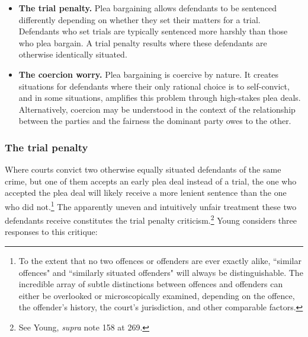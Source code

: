 \begin{itemize}
    \item \textbf{The trial penalty.} Plea bargaining allows defendants to be sentenced differently depending on whether they set their matters for a trial. Defendants who set trials are typically sentenced more harshly than those who plea bargain. A trial penalty results where these defendants are otherwise identically situated.
    \item \textbf{The coercion worry.} Plea bargaining is coercive by nature. It creates situations for defendants where their only rational choice is to self-convict, and in some situations, amplifies this problem through high-stakes plea deals. Alternatively, coercion may be understood in the context of the relationship between the parties and the fairness the dominant party owes to the other.
\end{itemize}

\subsubsection{The trial penalty}

Where courts convict two otherwise equally situated defendants of the same crime, but one of them accepts an early plea deal instead of a trial, the one who accepted the plea deal will likely receive a more lenient sentence than the one who did not.\footnote{To the extent that no two offences or offenders are ever exactly alike, ``similar offences" and ``similarly situated offenders" will always be distinguishable. The incredible array of subtle distinctions between offences and offenders can either be overlooked or microscopically examined, depending on the offence, the offender's history, the court's jurisdiction, and other comparable factors.} The apparently uneven and intuitively unfair treatment these two defendants receive constitutes the trial penalty criticism.\footnote{See Young, \textit{supra} note 158 at 269.} Young considers three responses to this critique:


